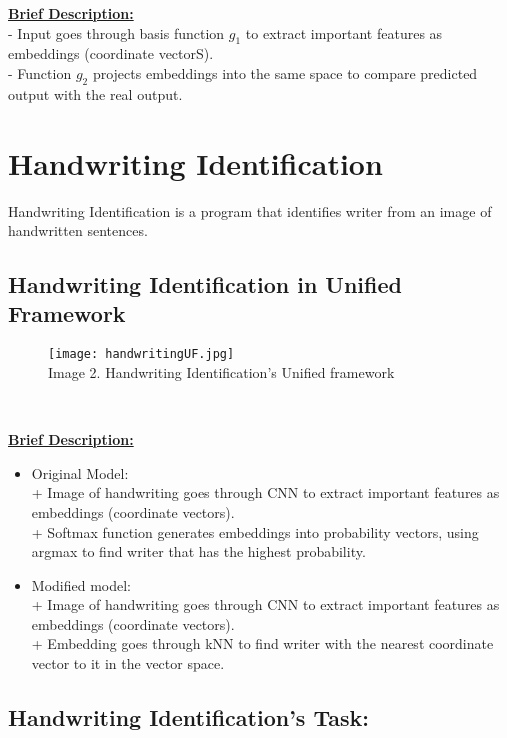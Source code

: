 \documentclass{article}
\begin{document}
\underline{\textbf{Brief Description:}} \\
- Input goes through basis function $g_1$ to extract important features as embeddings (coordinate vectorS). \\
- Function $g_2$ projects embeddings into the same space to compare predicted output with the real output.

\section{Handwriting Identification}

Handwriting Identification is a program that identifies writer from an image of handwritten sentences. \\

\subsection{Handwriting Identification in Unified Framework}

\begin{figure}[h!]
\centering\texttt{[image: handwritingUF.jpg]}
\\Image 2. Handwriting Identification's Unified framework\\
\end{figure}\

\underline{\textbf{Brief Description:}} \\
\begin{itemize}
    \item Original Model: \\
    + Image of handwriting goes through CNN to extract important features as embeddings (coordinate vectors).\\
    + Softmax function generates embeddings into probability vectors, using argmax to find writer that has the highest probability. 
    \item Modified model: \\
    + Image of handwriting goes through CNN to extract important features as embeddings (coordinate vectors).\\
    + Embedding goes through kNN to find  writer with the nearest coordinate vector to it in the vector space.
\end{itemize}

\subsection{Handwriting Identification's Task:}
\end{document}
